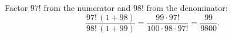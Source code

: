 Factor $97!$ from the numerator and $98!$ from the denominator:
\[\dfrac{97!\,(1+98)}{98!\,(1+99)}=\dfrac{99\cdot97!}{100\cdot98\cdot97!}=\boxed{\dfrac{99}{9800}}.\]
